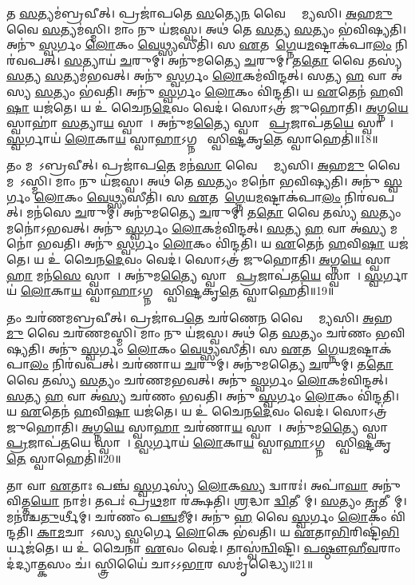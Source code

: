    𑌤 \ul{𑌸}𑌤𑍍𑌯𑌮॑𑌬𑍍𑌰𑌵𑍀𑌤𑍍।
   𑌪𑍍𑌰𑌜𑌾॑𑌪𑌤𑍇 \ul{𑌸}𑌤𑍍𑌯𑍇\ul{𑌨} 𑌵𑍈 𑌶𑍍𑌰𑌾᳚𑌮𑍍𑌯𑌸𑌿।
   \ul{𑌅}𑌹\ul{𑌮𑍁} 𑌵𑍈 \ul{𑌸}𑌤𑍍𑌯𑌮॑𑌸𑍍𑌮𑌿।
   𑌮𑌾𑌂 𑌨𑍁 𑌯॑𑌜𑌸𑍍𑌵।
   𑌅𑌥॑ 𑌤𑍇 \ul{𑌸}𑌤𑍍𑌯 \ul{𑌸}𑌤𑍍𑌯𑌂 𑌭॑𑌵𑌿𑌷𑍍𑌯𑌤𑌿।
   𑌅𑌨𑍁॑ \ul{𑌸𑍍𑌵}𑌰𑍍𑌗𑌂 \ul{𑌲𑍋}𑌕𑌂 \ul{𑌵𑍇}𑌥𑍍𑌸𑍍𑌯𑌸𑍀𑌤𑌿॑।
   𑌸 \ul{𑌏}𑌤𑌮𑌾᳚\ul{𑌗𑍍𑌨𑍇}𑌯\ul{𑌮}𑌷𑍍𑌟𑌾𑌕॑𑌪𑌾\ul{𑌲𑌂} 𑌨𑌿𑌰॑𑌵𑌪𑌤𑍍।
   \ul{𑌸}𑌤𑍍𑌯𑌾𑌯॑ \ul{𑌚}𑌰𑍁𑌮𑍍।
   𑌅𑌨𑍁॑𑌮𑌤𑍍𑌯𑍈 \ul{𑌚}𑌰𑍁𑌮𑍍।
   𑌤\ul{𑌤𑍋} 𑌵𑍈 𑌤𑌸𑍍𑌯॑ \ul{𑌸}𑌤𑍍𑌯 \ul{𑌸}𑌤𑍍𑌯𑌮॑𑌭𑌵𑌤𑍍।
   𑌅𑌨𑍁॑ \ul{𑌸𑍍𑌵}𑌰𑍍𑌗𑌂 \ul{𑌲𑍋}𑌕𑌮॑𑌵𑌿𑌨𑍍𑌦𑌤𑍍।
   𑌸𑌤𑍍𑌯 \ul{𑌹} 𑌵𑌾 𑌅॑𑌸𑍍𑌯 \ul{𑌸}𑌤𑍍𑌯𑌂 𑌭॑𑌵𑌤𑌿।
   𑌅𑌨𑍁॑ \ul{𑌸𑍍𑌵}𑌰𑍍𑌗𑌂 \ul{𑌲𑍋}𑌕𑌂 𑌵𑌿॑𑌨𑍍𑌦𑌤𑌿।
   𑌯 \ul{𑌏}𑌤𑍇𑌨॑ \ul{𑌹}𑌵𑌿\ul{𑌷𑌾} 𑌯𑌜॑𑌤𑍇।
   𑌯 𑌉॑ 𑌚𑍈𑌨\ul{𑌦𑍇}𑌵𑌂 𑌵𑍇𑌦॑।
   𑌸𑍋𑌽𑌤𑍍𑌰॑ 𑌜𑍁𑌹𑍋𑌤𑌿।
   \ul{𑌅}𑌗𑍍𑌨\ul{𑌯𑍇} 𑌸𑍍𑌵𑌾𑌹𑌾॑ \ul{𑌸}𑌤𑍍𑌯𑌾\ul{𑌯} 𑌸𑍍𑌵𑌾𑌹𑌾᳚।
   𑌅𑌨𑍁॑𑌮\ul{𑌤𑍍𑌯𑍈} 𑌸𑍍𑌵𑌾𑌹𑌾᳚ \ul{𑌪𑍍𑌰}𑌜𑌾𑌪॑𑌤\ul{𑌯𑍇} 𑌸𑍍𑌵𑌾𑌹𑌾᳚।
   \ul{𑌸𑍍𑌵}𑌰𑍍𑌗𑌾𑌯॑ \ul{𑌲𑍋}𑌕𑌾\ul{𑌯} 𑌸𑍍𑌵𑌾\ul{𑌹𑌾}𑌽𑌗𑍍𑌨𑌯𑍇᳚ 𑌸𑍍𑌵𑌿\ul{𑌷𑍍𑌟}𑌕𑍃\ul{𑌤𑍇} 𑌸𑍍𑌵𑌾𑌹𑍇𑌤𑌿॑॥18॥

   𑌤𑌂 𑌮𑌨𑍋᳚𑌽𑌬𑍍𑌰𑌵𑍀𑌤𑍍।
   𑌪𑍍𑌰𑌜𑌾॑𑌪\ul{𑌤𑍇} 𑌮𑌨॑\ul{𑌸𑌾} 𑌵𑍈 𑌶𑍍𑌰𑌾᳚𑌮𑍍𑌯𑌸𑌿।
   \ul{𑌅}𑌹\ul{𑌮𑍁} 𑌵𑍈 𑌮𑌨𑍋᳚𑌽𑌸𑍍𑌮𑌿।
   𑌮𑌾𑌂 𑌨𑍁 𑌯॑𑌜𑌸𑍍𑌵।
   𑌅𑌥॑ 𑌤𑍇 \ul{𑌸}𑌤𑍍𑌯𑌂 𑌮𑌨𑍋॑ 𑌭𑌵𑌿𑌷𑍍𑌯𑌤𑌿।
   𑌅𑌨𑍁॑ \ul{𑌸𑍍𑌵}𑌰𑍍𑌗𑌂 \ul{𑌲𑍋}𑌕𑌂 \ul{𑌵𑍇}𑌥𑍍𑌸𑍍𑌯𑌸𑍀𑌤𑌿॑।
   𑌸 \ul{𑌏}𑌤𑌮𑌾᳚\ul{𑌗𑍍𑌨𑍇}𑌯\ul{𑌮}𑌷𑍍𑌟𑌾𑌕॑𑌪𑌾\ul{𑌲𑌂} 𑌨𑌿𑌰॑𑌵𑌪𑌤𑍍।
   𑌮𑌨॑𑌸𑍇 \ul{𑌚}𑌰𑍁𑌮𑍍।
   𑌅𑌨𑍁॑𑌮𑌤𑍍𑌯𑍈 \ul{𑌚}𑌰𑍁𑌮𑍍।
   𑌤\ul{𑌤𑍋} 𑌵𑍈 𑌤𑌸𑍍𑌯॑ \ul{𑌸}𑌤𑍍𑌯𑌂 𑌮𑌨𑍋॑𑌽𑌭𑌵𑌤𑍍।
   𑌅𑌨𑍁॑ \ul{𑌸𑍍𑌵}𑌰𑍍𑌗𑌂 \ul{𑌲𑍋}𑌕𑌮॑𑌵𑌿𑌨𑍍𑌦𑌤𑍍।
   \ul{𑌸}𑌤𑍍𑌯 \ul{𑌹} 𑌵𑌾 𑌅॑\ul{𑌸𑍍𑌯} 𑌮𑌨𑍋॑ 𑌭𑌵𑌤𑌿।
   𑌅𑌨𑍁॑ \ul{𑌸𑍍𑌵}𑌰𑍍𑌗𑌂 \ul{𑌲𑍋}𑌕𑌂 𑌵𑌿॑𑌨𑍍𑌦𑌤𑌿।
   𑌯 \ul{𑌏}𑌤𑍇𑌨॑ \ul{𑌹}𑌵𑌿\ul{𑌷𑌾} 𑌯𑌜॑𑌤𑍇।
   𑌯 𑌉॑ 𑌚𑍈𑌨\ul{𑌦𑍇}𑌵𑌂 𑌵𑍇𑌦॑।
   𑌸𑍋𑌽𑌤𑍍𑌰॑ 𑌜𑍁𑌹𑍋𑌤𑌿।
   \ul{𑌅}𑌗𑍍𑌨\ul{𑌯𑍇} 𑌸𑍍𑌵𑌾\ul{𑌹𑌾} 𑌮𑌨॑\ul{𑌸𑍇} 𑌸𑍍𑌵𑌾𑌹𑌾᳚।
   𑌅𑌨𑍁॑𑌮\ul{𑌤𑍍𑌯𑍈} 𑌸𑍍𑌵𑌾𑌹𑌾᳚ \ul{𑌪𑍍𑌰}𑌜𑌾𑌪॑𑌤\ul{𑌯𑍇} 𑌸𑍍𑌵𑌾𑌹𑌾᳚।
   \ul{𑌸𑍍𑌵}𑌰𑍍𑌗𑌾𑌯॑ \ul{𑌲𑍋}𑌕𑌾\ul{𑌯} 𑌸𑍍𑌵𑌾\ul{𑌹𑌾}𑌽𑌗𑍍𑌨𑌯𑍇᳚ 𑌸𑍍𑌵𑌿\ul{𑌷𑍍𑌟}𑌕𑍃\ul{𑌤𑍇} 𑌸𑍍𑌵𑌾𑌹𑍇𑌤𑌿॑॥19॥

   𑌤𑌂 𑌚𑌰॑𑌣𑌮𑌬𑍍𑌰𑌵𑍀𑌤𑍍।
   𑌪𑍍𑌰𑌜𑌾॑𑌪\ul{𑌤𑍇} 𑌚𑌰॑𑌣𑍇\ul{𑌨} 𑌵𑍈 𑌶𑍍𑌰𑌾᳚𑌮𑍍𑌯𑌸𑌿।
   \ul{𑌅}𑌹\ul{𑌮𑍁} 𑌵𑍈 𑌚𑌰॑𑌣𑌮𑌸𑍍𑌮𑌿।
   𑌮𑌾𑌂 𑌨𑍁 𑌯॑𑌜𑌸𑍍𑌵।
   𑌅𑌥॑ 𑌤𑍇 \ul{𑌸}𑌤𑍍𑌯𑌂 𑌚𑌰॑𑌣𑌂 𑌭𑌵𑌿𑌷𑍍𑌯𑌤𑌿।
   𑌅𑌨𑍁॑ \ul{𑌸𑍍𑌵}𑌰𑍍𑌗𑌂 \ul{𑌲𑍋}𑌕𑌂 \ul{𑌵𑍇}𑌥𑍍𑌸𑍍𑌯𑌸𑍀𑌤𑌿॑।
   𑌸 \ul{𑌏}𑌤𑌮𑌾᳚\ul{𑌗𑍍𑌨𑍇}𑌯\ul{𑌮}𑌷𑍍𑌟𑌾𑌕॑𑌪𑌾\ul{𑌲𑌂} 𑌨𑌿𑌰॑𑌵𑌪𑌤𑍍।
   𑌚𑌰॑𑌣𑌾𑌯 \ul{𑌚}𑌰𑍁𑌮𑍍।
   𑌅𑌨𑍁॑𑌮𑌤𑍍𑌯𑍈 \ul{𑌚}𑌰𑍁𑌮𑍍।
   𑌤\ul{𑌤𑍋} 𑌵𑍈 𑌤𑌸𑍍𑌯॑ \ul{𑌸}𑌤𑍍𑌯𑌂 𑌚𑌰॑𑌣𑌮𑌭𑌵𑌤𑍍।
   𑌅𑌨𑍁॑ \ul{𑌸𑍍𑌵}𑌰𑍍𑌗𑌂 \ul{𑌲𑍋}𑌕𑌮॑𑌵𑌿𑌨𑍍𑌦𑌤𑍍।
   \ul{𑌸}𑌤𑍍𑌯 \ul{𑌹} 𑌵𑌾 𑌅॑\ul{𑌸𑍍𑌯} 𑌚𑌰॑𑌣𑌂 𑌭𑌵𑌤𑌿।
   𑌅𑌨𑍁॑ \ul{𑌸𑍍𑌵}𑌰𑍍𑌗𑌂 \ul{𑌲𑍋}𑌕𑌂 𑌵𑌿॑𑌨𑍍𑌦𑌤𑌿।
   𑌯 \ul{𑌏}𑌤𑍇𑌨॑ \ul{𑌹}𑌵𑌿\ul{𑌷𑌾} 𑌯𑌜॑𑌤𑍇।
   𑌯 𑌉॑ 𑌚𑍈𑌨\ul{𑌦𑍇}𑌵𑌂 𑌵𑍇𑌦॑।
   𑌸𑍋𑌽𑌤𑍍𑌰॑ 𑌜𑍁𑌹𑍋𑌤𑌿।
   \ul{𑌅}𑌗𑍍𑌨\ul{𑌯𑍇} 𑌸𑍍𑌵𑌾\ul{𑌹𑌾} 𑌚𑌰॑𑌣𑌾\ul{𑌯} 𑌸𑍍𑌵𑌾𑌹𑌾᳚।
   𑌅𑌨𑍁॑𑌮\ul{𑌤𑍍𑌯𑍈} 𑌸𑍍𑌵𑌾𑌹𑌾᳚ \ul{𑌪𑍍𑌰}𑌜𑌾𑌪॑\ul{𑌤}𑌯𑍇 𑌸𑍍𑌵𑌾𑌹𑌾᳚।
   \ul{𑌸𑍍𑌵}𑌰𑍍𑌗𑌾𑌯॑ \ul{𑌲𑍋}𑌕𑌾\ul{𑌯} 𑌸𑍍𑌵𑌾\ul{𑌹𑌾}𑌽𑌗𑍍𑌨𑌯𑍇᳚ 𑌸𑍍𑌵𑌿\ul{𑌷𑍍𑌟}𑌕𑍃\ul{𑌤𑍇} 𑌸𑍍𑌵𑌾𑌹𑍇𑌤𑌿॑॥20॥

   𑌤𑌾 𑌵𑌾 \ul{𑌏}𑌤𑌾𑌃 𑌪𑌞𑍍𑌚॑ \ul{𑌸𑍍𑌵}𑌰𑍍𑌗𑌸𑍍𑌯॑ \ul{𑌲𑍋}𑌕\ul{𑌸𑍍𑌯} 𑌦𑍍𑌵𑌾𑌰𑌃॑।
   𑌅𑌪𑌾॑\ul{𑌘𑌾} 𑌅𑌨𑍁॑𑌵𑌿𑌤𑍍𑌤\ul{𑌯𑍋} 𑌨𑌾𑌮॑।
   𑌤𑌪𑌃॑ 𑌪𑍍𑌰\ul{𑌥}𑌮𑌾 𑌰॑𑌕𑍍𑌷𑌤𑌿।
   \ul{𑌶𑍍𑌰}𑌦𑍍𑌧𑌾 \ul{𑌦𑍍𑌵𑌿}𑌤𑍀𑌯𑌾᳚𑌮𑍍।
   \ul{𑌸}𑌤𑍍𑌯𑌂 \ul{𑌤𑍃}𑌤𑍀𑌯𑌾᳚𑌮𑍍।
   𑌮𑌨॑𑌶𑍍𑌚\ul{𑌤𑍁}𑌰𑍍𑌥𑍀𑌮𑍍।
   𑌚𑌰॑𑌣𑌂 𑌪\ul{𑌞𑍍𑌚}𑌮𑍀𑌮𑍍।
   𑌅𑌨𑍁॑ \ul{𑌹} 𑌵𑍈 \ul{𑌸𑍍𑌵}𑌰𑍍𑌗𑌂 \ul{𑌲𑍋}𑌕𑌂 𑌵𑌿॑𑌨𑍍𑌦𑌤𑌿।
   \ul{𑌕𑌾}\ul{𑌮}𑌚𑌾𑌰𑍋᳚𑌽𑌸𑍍𑌯 \ul{𑌸𑍍𑌵}𑌰𑍍𑌗𑍇 \ul{𑌲𑍋}𑌕𑍇 𑌭॑𑌵𑌤𑌿।
   𑌯 \ul{𑌏}𑌤𑌾\ul{𑌭𑌿}𑌰𑌿𑌷𑍍𑌟𑌿॑\ul{𑌭𑌿}𑌰𑍍𑌯𑌜॑𑌤𑍇।
   𑌯 𑌉॑ 𑌚𑍈𑌨𑌾 \ul{𑌏}𑌵𑌂 𑌵𑍇𑌦॑।
   𑌤𑌾𑌸𑍍𑌵॑\ul{𑌨𑍍𑌵𑌿}𑌷𑍍𑌟𑌿।
   \ul{𑌪}\ul{𑌷𑍍𑌠𑍗}\ul{𑌹𑍀}\ul{𑌵}𑌰𑌾𑌂 𑌦॑𑌦𑍍𑌯𑌾\ul{𑌤𑍍𑌕}\ul{}𑌸𑌂 𑌚॑।
   𑌸𑍍𑌤𑍍𑌰𑌿𑌯𑍈॑ 𑌚𑌾𑌽𑌽\ul{𑌭𑌾}𑌰 𑌸𑌮𑍃॑𑌦𑍍𑌧𑍍𑌯𑍈॥21॥\anuvakamend
  

